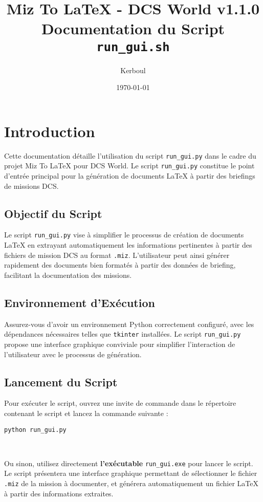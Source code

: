 \documentclass{article}
\title{Miz To LaTeX - DCS World v1.1.0\\ \large Documentation du Script \texttt{run\_gui.sh}}
\author{Kerboul}
\date{\today}
\begin{document}
\maketitle

\section{Introduction}
Cette documentation détaille l'utilisation du script \texttt{run\_gui.py} dans le cadre du projet Miz To LaTeX pour DCS World. Le script \texttt{run\_gui.py} constitue le point d'entrée principal pour la génération de documents LaTeX à partir des briefings de missions DCS.

\subsection{Objectif du Script}
Le script \texttt{run\_gui.py} vise à simplifier le processus de création de documents LaTeX en extrayant automatiquement les informations pertinentes à partir des fichiers de mission DCS au format \texttt{.miz}. L'utilisateur peut ainsi générer rapidement des documents bien formatés à partir des données de briefing, facilitant la documentation des missions.

\subsection{Environnement d'Exécution}
Assurez-vous d'avoir un environnement Python correctement configuré, avec les dépendances nécessaires telles que \texttt{tkinter} installées. Le script \texttt{run\_gui.py} propose une interface graphique conviviale pour simplifier l'interaction de l'utilisateur avec le processus de génération.

\subsection{Lancement du Script}
Pour exécuter le script, ouvrez une invite de commande dans le répertoire contenant le script et lancez la commande suivante :
\begin{verbatim}
python run_gui.py
\end{verbatim}\

Ou sinon, utilisez directement \textbf{l'exécutable} \texttt{run\_gui.exe} pour lancer le script.\\

Le script présentera une interface graphique permettant de sélectionner le fichier \texttt{.miz} de la mission à documenter, et générera automatiquement un fichier LaTeX à partir des informations extraites.
\end{document}
